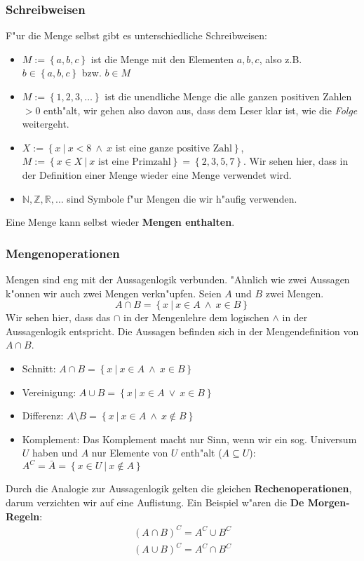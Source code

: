 \subsubsection{Schreibweisen}
F"ur die Menge selbst gibt es unterschiedliche Schreibweisen:
\begin{itemize}
\item $M := \left\{a, b, c\right\}$ ist die Menge mit den Elementen $a,b,c$, also z.B. $b \in  \left\{a, b, c\right\}$ bzw. $b \in M$
\item $M := \left\{1, 2, 3, \ldots \right\}$ ist die unendliche Menge die alle ganzen positiven Zahlen $> 0$ enth"alt, wir gehen also davon aus, dass dem Leser klar ist, wie die \textit{Folge} weitergeht.
\item $X:= \left\{x \ | \ x < 8 \ \land \ x \text{ ist eine ganze positive Zahl} \right\}$,\\$M := \left\{x \in X \ | \ x \text{ ist eine Primzahl} \right\} = \left\{2, 3, 5, 7\right\}$. Wir sehen hier, dass in der Definition einer Menge wieder eine Menge verwendet wird.
\item $\mathbb{N}, \mathbb{Z}, \mathbb{R}, \ldots$ sind Symbole f"ur Mengen die wir h"aufig verwenden.
\end{itemize}
Eine Menge kann selbst wieder \textbf{Mengen enthalten}. 

\subsubsection{Mengenoperationen}
Mengen sind eng mit der Aussagenlogik verbunden. "Ahnlich wie zwei Aussagen k"onnen wir auch zwei Mengen verkn"upfen. Seien $A$ und $B$ zwei Mengen.
\begin{equation*}
A \cap B = \left\{ x \ | \ x \in A \ \land \ x \in B \right\}
\end{equation*}
Wir sehen hier, dass das $\cap$ in der Mengenlehre dem logischen $\land$ in der Aussagenlogik entspricht. Die Aussagen  befinden sich in der Mengendefinition von $A \cap B$.
\begin{itemize}
\item Schnitt: $A \cap B =  \left\{x \ | \ x \in A \ \land \ x \in B \right\}$
\item Vereinigung: $A \cup B =  \left\{x \ | \ x \in A \ \lor \ x \in B \right\}$
\item Differenz: $A \setminus B =  \left\{x \ | \ x \in A \ \land \ x \notin B \right\}$
\item Komplement: Das Komplement macht nur Sinn, wenn wir ein sog. Universum $U$ haben und $A$ nur Elemente von $U$ enth"alt ($A \subseteq U$): $A^C = \bar{A} = \left\{x \in U \ | \ x \notin A \right\}$
\end{itemize}
Durch die Analogie zur Aussagenlogik gelten die gleichen \textbf{Rechenoperationen}, darum verzichten wir auf eine Auflistung. Ein Beispiel w"aren die \textbf{De Morgen-Regeln}:
\begin{gather*}
(A \cap B)^C = A^C \cup B^C \\
(A \cup B)^C = A^C \cap B^C 
\end{gather*} 

